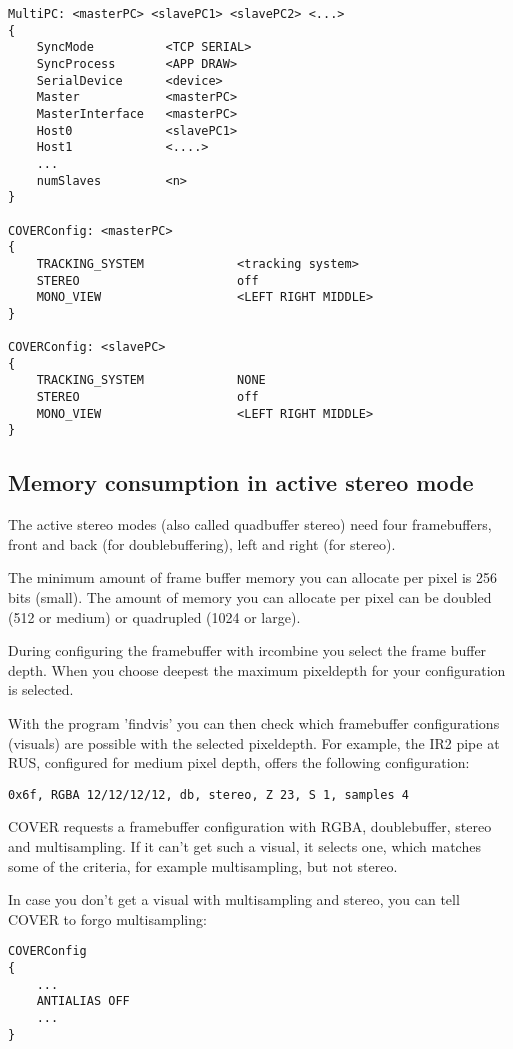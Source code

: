 \small 
\begin{verbatim}
MultiPC: <masterPC> <slavePC1> <slavePC2> <...>
{
    SyncMode          <TCP SERIAL>
    SyncProcess       <APP DRAW>
    SerialDevice      <device>
    Master            <masterPC>
    MasterInterface   <masterPC>
    Host0             <slavePC1>    
    Host1             <....>
    ...
    numSlaves         <n>
}

COVERConfig: <masterPC>
{
    TRACKING_SYSTEM             <tracking system>
    STEREO                      off
    MONO_VIEW                   <LEFT RIGHT MIDDLE>
}

COVERConfig: <slavePC>
{
    TRACKING_SYSTEM             NONE
    STEREO                      off
    MONO_VIEW                   <LEFT RIGHT MIDDLE>
}

\end{verbatim}
\normalsize



\subsection{Memory consumption in active stereo mode} 
The active stereo modes (also called quadbuffer stereo) need four framebuffers, 
front and back (for doublebuffering), left and right (for stereo). 

The minimum amount of frame buffer memory you can allocate per pixel is 256 bits (small). The
amount of memory you can allocate per pixel can be doubled (512 or medium) or quadrupled 
(1024 or large).

During configuring the framebuffer with ircombine you select the frame buffer depth.
When you choose deepest the maximum pixeldepth for your configuration is selected.

With the program 'findvis' you can then check which framebuffer configurations (visuals)
are possible with the selected pixeldepth. For example, the IR2 pipe at RUS, configured for medium pixel depth,
offers the following configuration:
\small 
\begin{verbatim}
0x6f, RGBA 12/12/12/12, db, stereo, Z 23, S 1, samples 4
\end{verbatim}
\normalsize

COVER requests a framebuffer configuration with RGBA, doublebuffer, stereo and multisampling.
If it can't get such a visual, it selects one, which matches some of the criteria, for
example multisampling, but not stereo.

In case you don't get a visual with multisampling and stereo, you can tell COVER
to forgo multisampling:
\small 
\begin{verbatim}
COVERConfig
{
    ...
    ANTIALIAS OFF
    ...
}
\end{verbatim}
\normalsize


